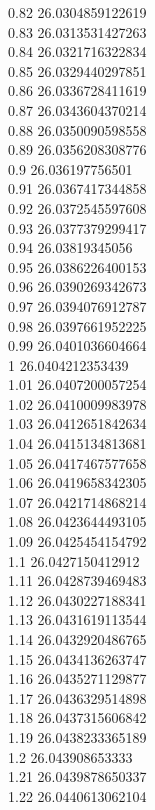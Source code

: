 {0.82	26.0304859122619\\
0.83	26.0313531427263\\
0.84	26.0321716322834\\
0.85	26.0329440297851\\
0.86	26.0336728411619\\
0.87	26.0343604370214\\
0.88	26.0350090598558\\
0.89	26.0356208308776\\
0.9	26.036197756501\\
0.91	26.0367417344858\\
0.92	26.0372545597608\\
0.93	26.0377379299417\\
0.94	26.03819345056\\
0.95	26.0386226400153\\
0.96	26.0390269342673\\
0.97	26.0394076912787\\
0.98	26.0397661952225\\
0.99	26.0401036604664\\
1	26.0404212353439\\
1.01	26.0407200057254\\
1.02	26.0410009983978\\
1.03	26.0412651842634\\
1.04	26.0415134813681\\
1.05	26.0417467577658\\
1.06	26.0419658342305\\
1.07	26.0421714868214\\
1.08	26.0423644493105\\
1.09	26.0425454154792\\
1.1	26.0427150412912\\
1.11	26.0428739469483\\
1.12	26.0430227188341\\
1.13	26.0431619113544\\
1.14	26.0432920486765\\
1.15	26.0434136263747\\
1.16	26.0435271129877\\
1.17	26.0436329514898\\
1.18	26.0437315606842\\
1.19	26.0438233365189\\
1.2	26.043908653333\\
1.21	26.0439878650337\\
1.22	26.0440613062104\\
}

